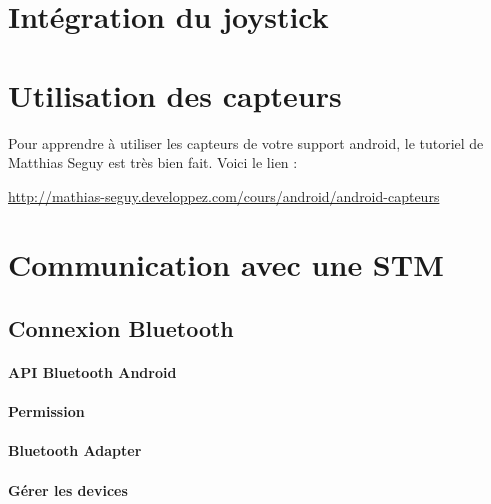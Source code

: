 \documentclass[a4paper,10pt]{article}
\begin{document}

\section{Intégration du joystick}


\section{Utilisation des capteurs}
Pour apprendre à utiliser les capteurs de votre support android, le tutoriel de Matthias Seguy est très bien fait. 
Voici le lien : 

\url{http://mathias-seguy.developpez.com/cours/android/android-capteurs}

\section{Communication avec une STM}

\subsection{Connexion Bluetooth}
	\paragraph{API Bluetooth Android}
	\paragraph{Permission}
	\paragraph{Bluetooth Adapter}
	
	\paragraph{Gérer les devices}
\end{document}
